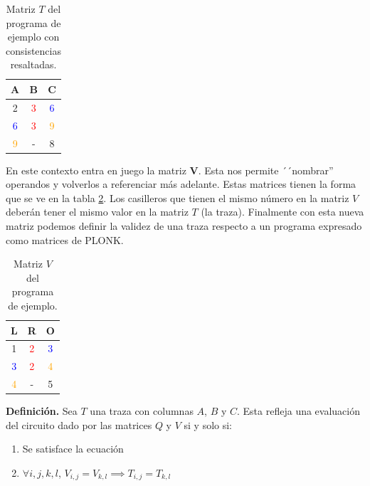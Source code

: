 \begin{table}
\begin{center}
\begin{tabular}{ccc}
\toprule
A & B & C \\
\midrule
2 & \textcolor{red}{3} & \textcolor{blue}{6} \\
\textcolor{blue}{6} & \textcolor{red}{3} & \textcolor{orange}{9} \\
\textcolor{orange}{9} & - & 8 \\
\bottomrule
\end{tabular}
\caption{Matriz $T$ del programa de ejemplo con consistencias resaltadas.}
\label{tab:matriz_t_consistencia}
\end{center}
\end{table}

En este contexto entra en juego la matriz \textbf{V}. Esta nos permite ´´nombrar'' operandos y volverlos a referenciar más adelante. Estas matrices tienen la forma que se ve en la tabla \ref{tab:matriz_v}. Los casilleros que tienen el mismo número en la matriz $V$ deberán tener el mismo valor en la matriz $T$ (la traza). Finalmente con esta nueva matriz podemos definir la validez de una traza respecto a un programa expresado como matrices de PLONK.

\begin{table}[h!]
\begin{center}
\begin{tabular}{ccc}
\toprule
L & R & O \\
\midrule
1 & \textcolor{red}{2} & \textcolor{blue}{3} \\
\textcolor{blue}{3} & \textcolor{red}{2} & \textcolor{orange}{4} \\
\textcolor{orange}{4} & - & 5 \\
\bottomrule
\end{tabular}
\caption{Matriz $V$ del programa de ejemplo.}
\label{tab:matriz_v}
\end{center}
\end{table}


\label{def:validez_traza}
\textbf{Definición.} Sea $T$ una traza con columnas $A$, $B$ y $C$. Esta refleja una evaluación del circuito dado por las matrices $Q$ y $V$ si y solo si:
\begin{enumerate}
    \item Se satisface la ecuación \PlonkFormula
    \item $\forall i,j,k,l$, $V_{i,j} = V_{k,l} \implies T_{i,j} = T_{k,l}$
\end{enumerate}

